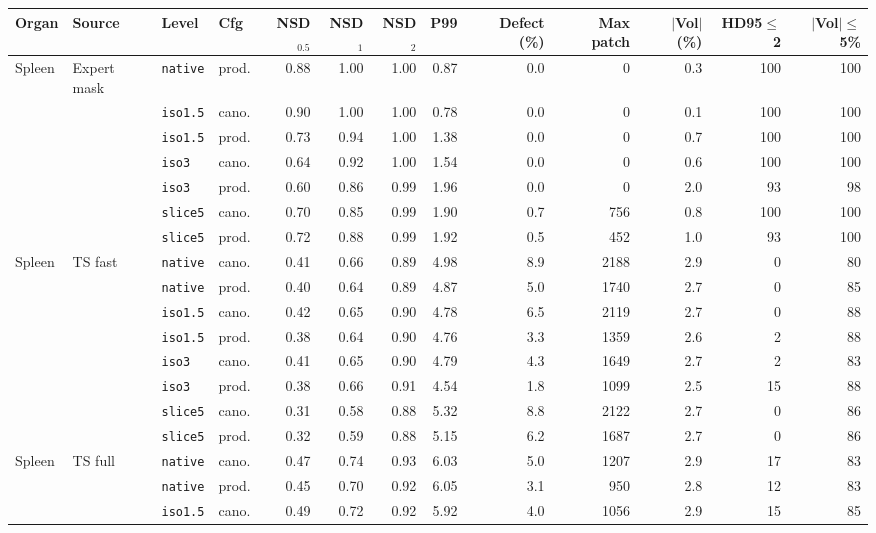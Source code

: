 \begin{tabular}{llllrrrrrrrrr}
\toprule
Organ & Source & Level & Cfg & NSD$_{0.5}$ & NSD$_1$ & NSD$_2$ & P99 & Defect (\%) & Max patch & $|$Vol$|$ (\%) & HD95$\leq$2 & $|$Vol$|\leq$5\% \\
\midrule
Spleen & Expert mask & \texttt{native} & prod. & 0.88 & 1.00 & 1.00 & 0.87 & 0.0 & 0 & 0.3 & 100 & 100 \\
 &  & \texttt{iso1.5} & cano. & 0.90 & 1.00 & 1.00 & 0.78 & 0.0 & 0 & 0.1 & 100 & 100 \\
 &  & \texttt{iso1.5} & prod. & 0.73 & 0.94 & 1.00 & 1.38 & 0.0 & 0 & 0.7 & 100 & 100 \\
 &  & \texttt{iso3} & cano. & 0.64 & 0.92 & 1.00 & 1.54 & 0.0 & 0 & 0.6 & 100 & 100 \\
 &  & \texttt{iso3} & prod. & 0.60 & 0.86 & 0.99 & 1.96 & 0.0 & 0 & 2.0 & 93 & 98 \\
 &  & \texttt{slice5} & cano. & 0.70 & 0.85 & 0.99 & 1.90 & 0.7 & 756 & 0.8 & 100 & 100 \\
 &  & \texttt{slice5} & prod. & 0.72 & 0.88 & 0.99 & 1.92 & 0.5 & 452 & 1.0 & 93 & 100 \\
\midrule
Spleen & TS fast & \texttt{native} & cano. & 0.41 & 0.66 & 0.89 & 4.98 & 8.9 & 2188 & 2.9 & 0 & 80 \\
 &  & \texttt{native} & prod. & 0.40 & 0.64 & 0.89 & 4.87 & 5.0 & 1740 & 2.7 & 0 & 85 \\
 &  & \texttt{iso1.5} & cano. & 0.42 & 0.65 & 0.90 & 4.78 & 6.5 & 2119 & 2.7 & 0 & 88 \\
 &  & \texttt{iso1.5} & prod. & 0.38 & 0.64 & 0.90 & 4.76 & 3.3 & 1359 & 2.6 & 2 & 88 \\
 &  & \texttt{iso3} & cano. & 0.41 & 0.65 & 0.90 & 4.79 & 4.3 & 1649 & 2.7 & 2 & 83 \\
 &  & \texttt{iso3} & prod. & 0.38 & 0.66 & 0.91 & 4.54 & 1.8 & 1099 & 2.5 & 15 & 88 \\
 &  & \texttt{slice5} & cano. & 0.31 & 0.58 & 0.88 & 5.32 & 8.8 & 2122 & 2.7 & 0 & 86 \\
 &  & \texttt{slice5} & prod. & 0.32 & 0.59 & 0.88 & 5.15 & 6.2 & 1687 & 2.7 & 0 & 86 \\
\midrule
Spleen & TS full & \texttt{native} & cano. & 0.47 & 0.74 & 0.93 & 6.03 & 5.0 & 1207 & 2.9 & 17 & 83 \\
 &  & \texttt{native} & prod. & 0.45 & 0.70 & 0.92 & 6.05 & 3.1 & 950 & 2.8 & 12 & 83 \\
 &  & \texttt{iso1.5} & cano. & 0.49 & 0.72 & 0.92 & 5.92 & 4.0 & 1056 & 2.9 & 15 & 85 \\

\end{tabular}
